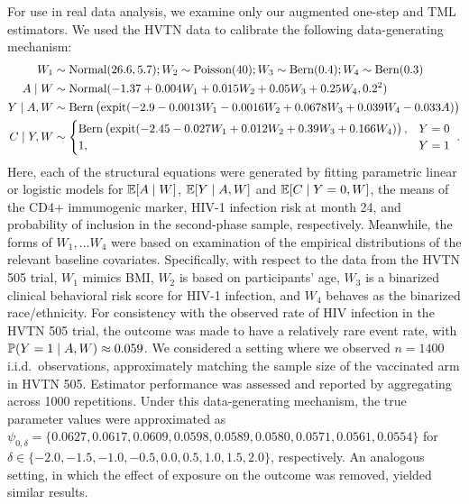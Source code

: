 For use in real data analysis, we examine only our augmented one-step and TML
estimators. We used the HVTN data to calibrate the following data-generating
mechanism:
\begin{align*}
  W_1 & \sim \mbox{Normal}(26.6, 5.7);
  W_2 \sim \text{Poisson}(40);
  W_3 \sim \operatorname{Bern}(0.4);
  W_4 \sim \operatorname{Bern}(0.3) \\
  A \mid W & \sim \mbox{Normal}(-1.37 + 0.004 W_1 + 0.015 W_2 + 0.05 W_3 +
    0.25 W_4, 0.2^2)\\
  Y \mid A, W & \sim \operatorname{Bern} \left(\operatorname{expit} (-2.9 - 0.0013 W_1 - 0.0016 W_2 +
    0.0678 W_3 + 0.039 W_4 - 0.033 A) \right) \\
  C \mid Y, W & \sim
    \begin{cases}
      \operatorname{Bern} \left(\operatorname{expit} (-2.45 - 0.027 W_1 + 0.012 W_2 + 0.39 W_3
      + 0.166 W_4) \right), & Y = 0 \\ 1, & Y = 1
    \end{cases} \ .
\end{align*}
Here, each of the structural equations were generated by fitting parametric
linear or logistic models for $\mathbb{E}[A \mid W]$, $\mathbb{E}[Y \mid A, W]$ and $\mathbb{E}[C \mid
Y = 0, W]$, the means of the CD4+ immunogenic marker, HIV-1 infection risk at
month 24, and probability of inclusion in the second-phase sample, respectively.
Meanwhile, the forms of $W_1, \ldots W_4$ were based on examination of the
empirical distributions of the relevant baseline covariates. Specifically, with
respect to the data from the HVTN 505 trial, $W_1$ mimics BMI, $W_2$ is based on
participants' age, $W_3$ is a binarized clinical behavioral risk score for HIV-1
infection, and $W_4$ behaves as the binarized race/ethnicity. For consistency
with the observed rate of HIV infection in the HVTN 505 trial, the outcome was
made to have a relatively rare event rate, with $\mathbb{P}(Y = 1 \mid A, W) \approx
0.059$. We considered a setting where we observed $n = 1400$
i.i.d.~observations, approximately matching the sample size of the vaccinated
arm in HVTN 505. Estimator performance was assessed and reported by aggregating
across 1000 repetitions. Under this data-generating mechanism, the true
parameter values were approximated as $\psi_{0,\delta} = \{0.0627, 0.0617,
0.0609, 0.0598, 0.0589, \allowbreak 0.0580, 0.0571, 0.0561, 0.0554\}$ for
$\delta \in \{-2.0, -1.5, -1.0, \allowbreak -0.5, 0.0, 0.5, 1.0, 1.5, 2.0\}$,
respectively. An analogous setting, in which the effect of exposure on the
outcome was removed, yielded similar results.

